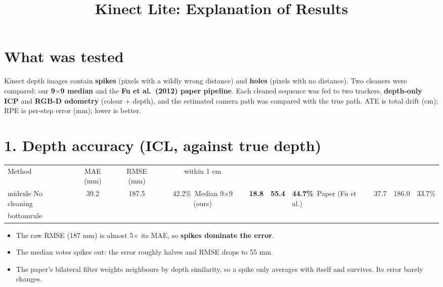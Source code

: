 \documentclass[11pt,a4paper]{article}
\title{Kinect Lite: Explanation of Results}
\date{}
\begin{document}
\maketitle

\section*{What was tested}
Kinect depth images contain \textbf{spikes} (pixels with a wildly wrong distance) and \textbf{holes} (pixels with no distance). Two cleaners were compared: our \textbf{9$\times$9 median} and the \textbf{Fu et al.\ (2012) paper pipeline}. Each cleaned sequence was fed to two trackers, \textbf{depth-only ICP} and \textbf{RGB-D odometry} (colour + depth), and the estimated camera path was compared with the true path. ATE is total drift (cm); RPE is per-step error (mm); lower is better.

\section*{1. Depth accuracy (ICL, against true depth)}
\begin{center}
\begin{tabular}{lccc}\toprule
Method & MAE (mm) & RMSE (mm) & within 1 cm\\midrule
No cleaning & 39.2 & 187.5 & 42.2\%\
Median 9$\times$9 (ours) & \textbf{18.8} & \textbf{55.4} & \textbf{44.7\%}\
Paper (Fu et al.) & 37.7 & 186.0 & 33.7\%\\bottomrule
\end{tabular}
\end{center}
\begin{itemize}[nosep]
\item The raw RMSE (187 mm) is almost 5$\times$ its MAE, so \textbf{spikes dominate the error}.
\item The median votes spikes out: the error roughly halves and RMSE drops to 55 mm.
\item The paper's bilateral filter weights neighbours by depth similarity, so a spike only averages with itself and survives. Its error barely changes.
\end{itemize}
\end{document}
